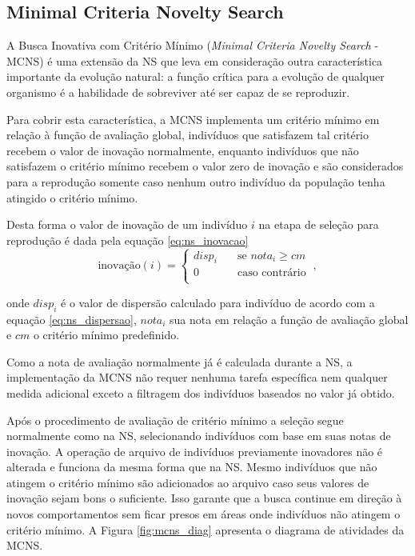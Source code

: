 \subsection{Minimal Criteria Novelty Search}

A Busca Inovativa com Critério Mínimo (\emph{Minimal Criteria Novelty Search} - MCNS) \cite{lehman2011evolving} é uma extensão da NS que leva em consideração outra característica importante da evolução natural: a função crítica para a evolução de qualquer organismo é a habilidade de sobreviver até ser capaz de se reproduzir.

Para cobrir esta característica, a MCNS implementa um critério mínimo em relação à função de avaliação global, indivíduos que satisfazem tal critério recebem o valor de inovação normalmente, enquanto indivíduos que não satisfazem o critério mínimo recebem o valor zero de inovação e são considerados para a reprodução somente caso nenhum outro indivíduo da população tenha atingido o critério mínimo.

Desta forma o valor de inovação de um indivíduo $i$ na etapa de seleção para reprodução é dada pela equação \ref{eq:ns_inovacao}
\begin{equation}
    \text{inovação}(i) = 
        \begin{cases}
            {disp}_i & \quad \text{se } {nota}_i \geq {cm} \\ 
            0 & \quad \text{caso contrário}\\
       \end{cases}~,
    \label{eq:ns_inovacao}
\end{equation}

\noindent onde ${disp}_i$ é o valor de dispersão calculado para indivíduo de acordo com a equação \ref{eq:ns_dispersao}, ${nota}_i$ sua nota em relação a função de avaliação global e ${cm}$ o critério mínimo predefinido.

Como a nota de avaliação normalmente já é calculada durante a NS, a implementação da MCNS não requer nenhuma tarefa específica nem qualquer medida adicional exceto a filtragem dos indivíduos baseados no valor já obtido.

Após o procedimento de avaliação de critério mínimo a seleção segue normalmente como na NS, selecionando indivíduos com base em suas notas de inovação. A operação de arquivo de indivíduos previamente inovadores não é alterada e funciona da mesma forma que na NS. Mesmo indivíduos que não atingem o critério mínimo são adicionados ao arquivo caso seus valores de inovação sejam bons o suficiente. Isso garante que a busca continue em direção à novos comportamentos sem ficar presos em áreas onde indivíduos não atingem o critério mínimo. A Figura \ref{fig:mcns_diag} apresenta o diagrama de atividades da MCNS.

